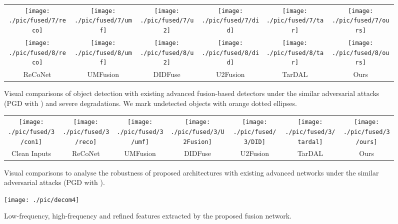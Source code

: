 \documentclass[sigconf]{acmart}
\begin{document}
\begin{figure*}[htb]
	\centering
	\setlength{\tabcolsep}{1pt}
	\begin{tabular}{cccccc}
\texttt{[image: ./pic/fused/7/reco]}
		&\texttt{[image: ./pic/fused/7/umf]}
		&\texttt{[image: ./pic/fused/7/u2]}
		&\texttt{[image: ./pic/fused/7/did]}
		&\texttt{[image: ./pic/fused/7/tar]}
		&\texttt{[image: ./pic/fused/7/ours]}\\
		\texttt{[image: ./pic/fused/8/reco]}
		&\texttt{[image: ./pic/fused/8/umf]}
		&\texttt{[image: ./pic/fused/8/u2]}
		&\texttt{[image: ./pic/fused/8/did]}
		&\texttt{[image: ./pic/fused/8/tar]}
		&\texttt{[image: ./pic/fused/8/ours]}\\
		\footnotesize ReCoNet&\footnotesize UMFusion&\footnotesize DIDFuse&\footnotesize U2Fusion&\footnotesize TarDAL& \footnotesize Ours
		\\
	\end{tabular}
	\vspace{-1em}
	\caption{Visual comparisons of object detection with existing advanced fusion-based detectors  under the similar adversarial attacks (PGD with ) and severe degradations. We mark undetected objects with orange dotted ellipses.}
	\label{fig:detec}
\end{figure*}
\begin{figure*}[htb]
	\centering
	\setlength{\tabcolsep}{1pt}
	\begin{tabular}{ccccccc}
\texttt{[image: ./pic/fused/3/con1]}
		&\texttt{[image: ./pic/fused/3/reco]}
		&\texttt{[image: ./pic/fused/3/umf]}
		&\texttt{[image: ./pic/fused/3/U2Fusion]}
		&\texttt{[image: ./pic/fused/3/DID]}
		&\texttt{[image: ./pic/fused/3/tardal]}
		&\texttt{[image: ./pic/fused/3/ours]}\\
		
		
		\footnotesize	Clean Inputs &\footnotesize ReCoNet&\footnotesize UMFusion&\footnotesize DIDFuse&\footnotesize U2Fusion&\footnotesize TarDAL& \footnotesize Ours
		\\
	\end{tabular}
	\vspace{-1em}
	\caption{Visual comparisons to analyse the robustness of proposed architectures with existing advanced networks under the similar adversarial attacks (PGD with ).}
	\label{fig:fusion}
\end{figure*}
\begin{figure}[htb]
	\centering
	\texttt{[image: ./pic/decom4]}
	
	\caption{{Low-frequency, high-frequency and refined features extracted by the proposed fusion network.}}
	\label{fig:decom}
\end{figure}
\end{document}
